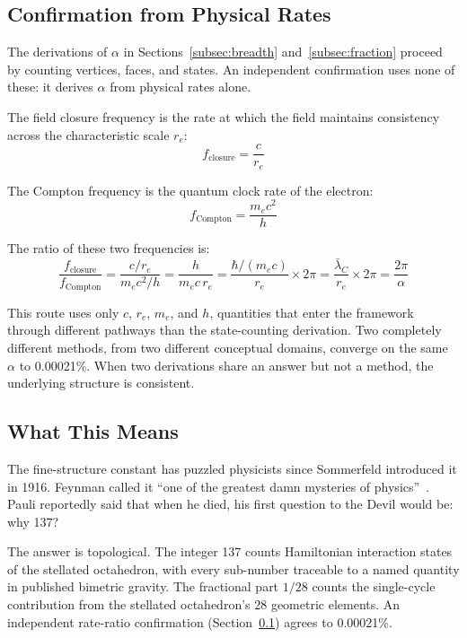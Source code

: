\documentclass[aps,prd,preprint,superscriptaddress,showpacs,preprintnumbers,amsmath,amssymb,nofootinbib]{revtex4-2}
\begin{document}
\subsection{Confirmation from Physical Rates}
\label{subsec:rates}

The derivations of $\alpha$ in Sections~\ref{subsec:breadth} and~\ref{subsec:fraction} proceed by counting vertices, faces, and states. An independent confirmation uses none of these: it derives $\alpha$ from physical rates alone.

The field closure frequency is the rate at which the field maintains consistency across the characteristic scale $r_e$:
\begin{equation}
f_{\text{closure}} = \frac{c}{r_e}
\end{equation}

The Compton frequency is the quantum clock rate of the electron:
\begin{equation}
f_{\text{Compton}} = \frac{m_e c^2}{h}
\end{equation}

The ratio of these two frequencies is:
\begin{equation}
\frac{f_{\text{closure}}}{f_{\text{Compton}}} = \frac{c/r_e}{m_e c^2/h} = \frac{h}{m_e c\,r_e} = \frac{\hbar/(m_e c)}{r_e} \times 2\pi = \frac{\bar{\lambda}_C}{r_e} \times 2\pi = \frac{2\pi}{\alpha}
\end{equation}

This route uses only $c$, $r_e$, $m_e$, and $h$, quantities that enter the framework through different pathways than the state-counting derivation. Two completely different methods, from two different conceptual domains, converge on the same $\alpha$ to 0.00021\%. When two derivations share an answer but not a method, the underlying structure is consistent.

\subsection{What This Means}
\label{subsec:alpha-meaning}

The fine-structure constant has puzzled physicists since Sommerfeld introduced it in 1916. Feynman called it ``one of the greatest damn mysteries of physics''~\cite{feynman1985}. Pauli reportedly said that when he died, his first question to the Devil would be: why 137?

The answer is topological. The integer 137 counts Hamiltonian interaction states of the stellated octahedron, with every sub-number traceable to a named quantity in published bimetric gravity. The fractional part $1/28$ counts the single-cycle contribution from the stellated octahedron's 28 geometric elements. An independent rate-ratio confirmation (Section~\ref{subsec:rates}) agrees to 0.00021\%.
\end{document}
